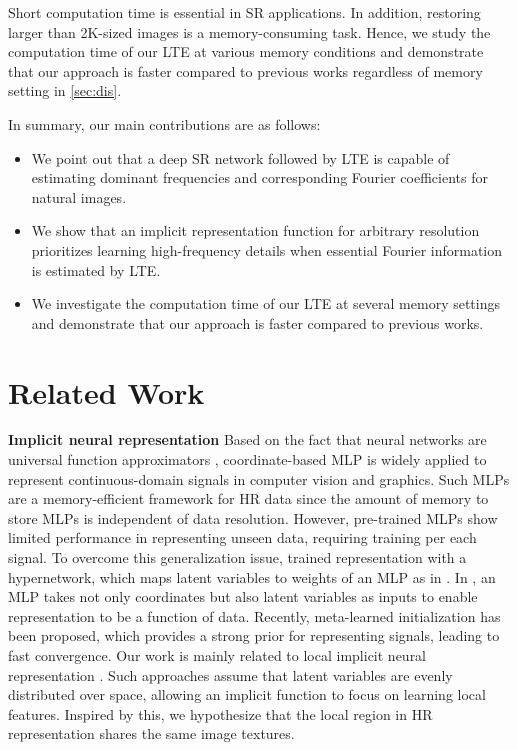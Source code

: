\documentclass[10pt,twocolumn,letterpaper]{article}
\begin{document}
Short computation time is essential in SR applications. In addition, restoring larger than 2K-sized images is a memory-consuming task. Hence, we study the computation time of our LTE at various memory conditions and demonstrate that our approach is faster compared to previous works regardless of memory setting in \cref{sec:dis}.





In summary, our main contributions are as follows:
\begin{itemize}
\item We point out that a deep SR network followed by LTE is capable of estimating dominant frequencies and corresponding Fourier coefficients for natural images.
    \item We show that an implicit representation function for arbitrary resolution prioritizes learning high-frequency details when essential Fourier information is estimated by LTE.
    \item We investigate the computation time of our LTE at several memory settings and demonstrate that our approach is faster compared to previous works.
\end{itemize}

\section{Related Work}
{\bf Implicit neural representation} Based on the fact that neural networks are universal function approximators \cite{10.5555/70405.70408}, coordinate-based MLP is widely applied to represent continuous-domain signals in computer vision and graphics. Such MLPs are a memory-efficient framework for HR data since the amount of memory to store MLPs is independent of data resolution. However, pre-trained MLPs show limited performance in representing unseen data, requiring training per each signal. To overcome this generalization issue, \cite{sitzmann2019srns, sitzmann2019siren} trained representation with a hypernetwork, which maps latent variables to weights of an MLP as in \cite{DBLP:conf/iclr/HaDL17}. In \cite{Park_2019_CVPR, Occupancy_Networks}, an MLP takes not only coordinates but also latent variables as inputs to enable representation to be a function of data. Recently, meta-learned initialization \cite{tancik2020meta} has been proposed, which provides a strong prior for representing signals, leading to fast convergence. Our work is mainly related to local implicit neural representation \cite{Local_Implicit_Grid_CVPR20, chen2021learning}. Such approaches assume that latent variables are evenly distributed over space, allowing an implicit function to focus on learning local features. Inspired by this, we hypothesize that the local region in HR representation shares the same image textures.
\end{document}
